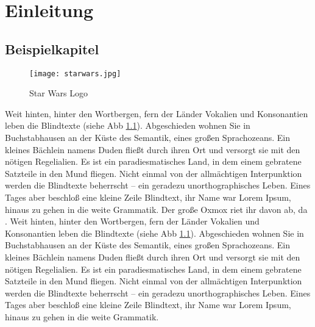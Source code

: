 \chapter{Einleitung}
\label{sec:grundlagen}
\lipsum[2]
\section{Beispielkapitel}
\label{sec:beispiel}
\begin{figure}[htb]
	\centering  
	\texttt{[image: starwars.jpg]}
	\caption{Star Wars Logo}
	\label{fig:starwars}
\end{figure}
Weit hinten, hinter den Wortbergen, fern der Länder Vokalien und Konsonantien leben die Blindtexte (siehe Abb \ref{fig:starwars}). Abgeschieden wohnen Sie in Buchstabhausen an der Küste des Semantik, eines großen Sprachozeans. Ein kleines Bächlein namens Duden fließt durch ihren Ort und versorgt sie mit den nötigen Regelialien. Es ist ein paradiesmatisches Land, in dem einem gebratene Satzteile in den Mund fliegen. Nicht einmal von der allmächtigen Interpunktion werden die Blindtexte beherrscht – ein geradezu unorthographisches Leben. Eines Tages aber beschloß eine kleine Zeile Blindtext, ihr Name war Lorem Ipsum, hinaus zu gehen in die weite Grammatik. Der große Oxmox riet ihr davon ab, da \cite{test}.
Weit hinten, hinter den Wortbergen, fern der Länder Vokalien und Konsonantien leben die Blindtexte (siehe Abb \ref{fig:starwars}). Abgeschieden wohnen Sie in Buchstabhausen an der Küste des Semantik, eines großen Sprachozeans. Ein kleines Bächlein namens Duden fließt durch ihren Ort und versorgt sie mit den nötigen Regelialien. Es ist ein paradiesmatisches Land, in dem einem gebratene Satzteile in den Mund fliegen. Nicht einmal von der allmächtigen Interpunktion werden die Blindtexte beherrscht – ein geradezu unorthographisches Leben. Eines Tages aber beschloß eine kleine Zeile Blindtext, ihr Name war Lorem Ipsum, hinaus zu gehen in die weite Grammatik.
 
